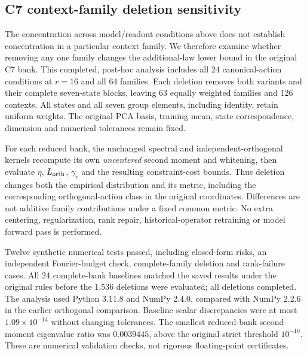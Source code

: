 \subsection{C7 context-family deletion sensitivity}
\label{app:c7-family-influence}
The concentration across model/readout conditions above does not establish concentration in a particular context family. We therefore examine whether removing any one family changes the additional-law lower bound in the original C7 bank. This completed, post-hoc analysis includes all 24 canonical-action conditions at $r=16$ and all 64 families. Each deletion removes both variants and their complete seven-state blocks, leaving 63 equally weighted families and 126 contexts. All states and all seven group elements, including identity, retain uniform weights. The original PCA basis, training mean, state correspondence, dimension and numerical tolerances remain fixed.

For each reduced bank, the unchanged spectral and independent-orthogonal kernels recompute its own \emph{uncentered} second moment and whitening, then evaluate $\eta$, $L_{\rm orth}$, $\gamma_r$ and the resulting constraint-cost bounds. Thus deletion changes both the empirical distribution and its metric, including the corresponding orthogonal-action class in the original coordinates. Differences are not additive family contributions under a fixed common metric. No extra centering, regularization, rank repair, historical-operator retraining or model forward pass is performed.

Twelve synthetic numerical tests passed, including closed-form risks, an independent Fourier-budget check, complete-family deletion and rank-failure cases. All 24 complete-bank baselines matched the saved results under the original rules before the 1,536 deletions were evaluated; all deletions completed. The analysis used Python 3.11.8 and NumPy 2.4.0, compared with NumPy 2.2.6 in the earlier orthogonal comparison. Baseline scalar discrepancies were at most $1.09\times10^{-14}$ without changing tolerances. The smallest reduced-bank second-moment eigenvalue ratio was $0.0039445$, above the original strict threshold $10^{-10}$. These are numerical validation checks, not rigorous floating-point certificates.

\begin{table}[t]
\centering\small
\setlength{\tabcolsep}{5pt}

\caption{C7 family-deletion sensitivity of the further-law lower endpoint $\ell^-$, at $r=16$, in all 24 model/readout conditions. Minima and maxima cover all 64 complete-family deletions, each with its own empirical whitening; they are not confidence intervals. The final column counts endpoints satisfying $\ell^->10^{-8}+10^{-7}|\ell^-|$, out of 64. Zero is an inconclusive bound on strict positivity. Values are rounded only for display; full-precision endpoints and family identities are retained.}
\label{tab:c7-family-influence}
\end{table}

